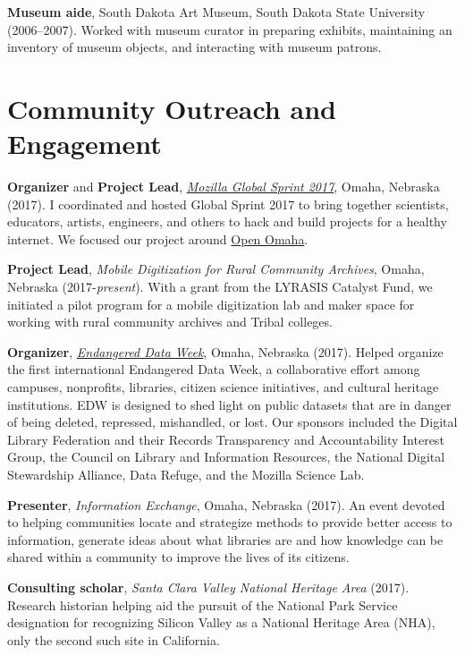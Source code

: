\textbf{Museum aide}, South Dakota Art Museum, South Dakota State
University (2006--2007). Worked with museum curator in preparing
exhibits, maintaining an inventory of museum objects, and interacting
with museum patrons.

\section{Community Outreach and
Engagement}\label{community-outreach-and-engagement}

\textbf{Organizer} and \textbf{Project Lead},
\emph{\href{https://mozilla.github.io/global-sprint/}{Mozilla Global
Sprint 2017}}, Omaha, Nebraska (2017). I coordinated and hosted Global
Sprint 2017 to bring together scientists, educators, artists, engineers,
and others to hack and build projects for a healthy internet. We focused
our project around \href{http://github.com/open-omaha/}{Open Omaha}.

\textbf{Project Lead}, \emph{Mobile Digitization for Rural Community
Archives}, Omaha, Nebraska (2017-\emph{present}). With a grant from the
LYRASIS Catalyst Fund, we initiated a pilot program for a mobile
digitization lab and maker space for working with rural community
archives and Tribal colleges.

\textbf{Organizer},
\emph{\href{http://endangereddataweek.org}{Endangered Data Week}},
Omaha, Nebraska (2017). Helped organize the first international
Endangered Data Week, a collaborative effort among campuses, nonprofits,
libraries, citizen science initiatives, and cultural heritage
institutions. EDW is designed to shed light on public datasets that are
in danger of being deleted, repressed, mishandled, or lost. Our sponsors
included the Digital Library Federation and their Records Transparency
and Accountability Interest Group, the Council on Library and
Information Resources, the National Digital Stewardship Alliance, Data
Refuge, and the Mozilla Science Lab.

\textbf{Presenter}, \emph{Information Exchange}, Omaha, Nebraska (2017).
An event devoted to helping communities locate and strategize methods to
provide better access to information, generate ideas about what
libraries are and how knowledge can be shared within a community to
improve the lives of its citizens.

\textbf{Consulting scholar}, \emph{Santa Clara Valley National Heritage
Area} (2017). Research historian helping aid the pursuit of the National
Park Service designation for recognizing Silicon Valley as a National
Heritage Area (NHA), only the second such site in California.


